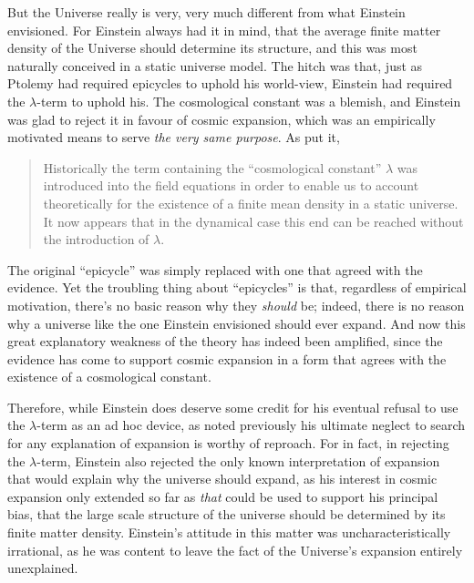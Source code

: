 \documentclass[12 pt]{article}
\begin{document}
But the Universe really is very, very much different from what Einstein envisioned. For Einstein always had it in mind, that the average finite matter density of the Universe should determine its structure, and this was most naturally conceived in a static universe model. The hitch was that, just as Ptolemy had required epicycles to uphold his world-view, Einstein had required the $\lambda$-term to uphold his. The cosmological constant was a blemish, and Einstein was glad to reject it in favour of cosmic expansion, which was an empirically motivated means to serve \textit{the very same purpose}. As \cite{Einstein1932} put it, 
\begin{quotation}
Historically the term containing the ``cosmological constant'' $\lambda$ was introduced into the field equations in order to enable us to account theoretically for the existence of a finite mean density in a static universe. It now appears that in the dynamical case this end can be reached without the introduction of $\lambda$.
\end{quotation}
The original ``epicycle'' was simply replaced with one that agreed with the evidence. Yet the troubling thing about ``epicycles'' is that, regardless of empirical motivation, there's no basic reason why they \textit{should} be; indeed, there is no reason why a universe like the one Einstein envisioned should ever expand. And now this great explanatory weakness of the theory has indeed been amplified, since the evidence has come to support cosmic expansion in a form that agrees with the existence of a cosmological constant.

Therefore, while Einstein does deserve some credit for his eventual refusal to use the $\lambda$-term as an ad hoc device, as noted previously his ultimate neglect to search for any explanation of expansion is worthy of reproach. For in fact, in rejecting the $\lambda$-term, Einstein also rejected the only known interpretation of expansion that would explain why the universe should expand, as his interest in cosmic expansion only extended so far as \textit{that} could be used to support his principal bias, that the large scale structure of the universe should be determined by its finite matter density. Einstein's attitude in this matter was uncharacteristically irrational, as he was content to leave the fact of the Universe's expansion entirely unexplained.
\end{document}
